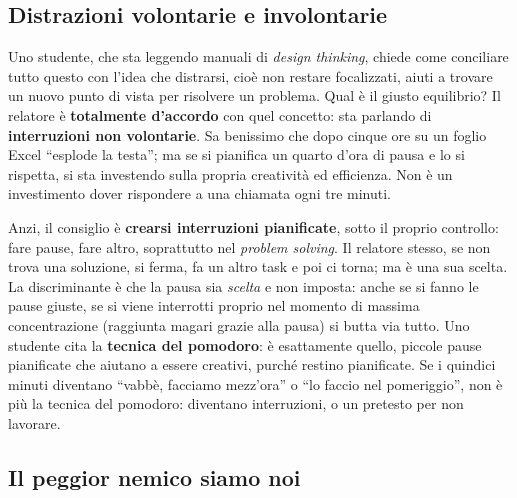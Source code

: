 \subsection{Distrazioni volontarie e involontarie}

Uno studente, che sta leggendo manuali di \emph{design thinking}, chiede come
conciliare tutto questo con l'idea che distrarsi, cioè non restare focalizzati,
aiuti a trovare un nuovo punto di vista per risolvere un problema. Qual è il
giusto equilibrio? Il relatore è \textbf{totalmente d'accordo} con quel concetto:
sta parlando di \textbf{interruzioni non volontarie}. Sa benissimo che dopo cinque
ore su un foglio Excel ``esplode la testa''; ma se si pianifica un quarto d'ora di
pausa e lo si rispetta, si sta investendo sulla propria creatività ed
efficienza. Non è un investimento dover rispondere a una chiamata ogni tre
minuti.

Anzi, il consiglio è \textbf{crearsi interruzioni pianificate}, sotto il proprio
controllo: fare pause, fare altro, soprattutto nel \emph{problem solving}. Il
relatore stesso, se non trova una soluzione, si ferma, fa un altro task e poi ci
torna; ma è una sua scelta. La discriminante è che la pausa sia \emph{scelta} e
non imposta: anche se si fanno le pause giuste, se si viene interrotti proprio
nel momento di massima concentrazione (raggiunta magari grazie alla pausa) si
butta via tutto. Uno studente cita la \textbf{tecnica del pomodoro}: è
esattamente quello, piccole pause pianificate che aiutano a essere creativi,
purché restino pianificate. Se i quindici minuti diventano ``vabbè, facciamo
mezz'ora'' o ``lo faccio nel pomeriggio'', non è più la tecnica del pomodoro:
diventano interruzioni, o un pretesto per non lavorare.

\subsection{Il peggior nemico siamo noi}

